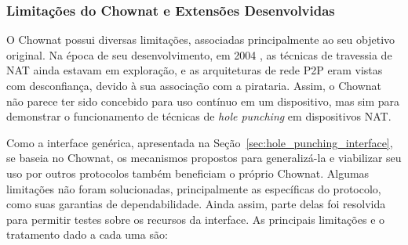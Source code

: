 \subsubsection{Limitações do Chownat e Extensões Desenvolvidas}
\label{sec:chownat_limitations}

O Chownat possui diversas limitações, associadas principalmente ao seu objetivo original. Na época de seu desenvolvimento, em 2004 \citep{kamkar2004chownat}, as técnicas de travessia de NAT ainda estavam em exploração, e as arquiteturas de rede P2P eram vistas com desconfiança, devido à sua associação com a pirataria. Assim, o Chownat não parece ter sido concebido para uso contínuo em um dispositivo, mas sim para demonstrar o funcionamento de técnicas de \textit{hole punching} em dispositivos NAT.

Como a interface genérica, apresentada na Seção~\ref{sec:hole_punching_interface}, se baseia no Chownat, os mecanismos propostos para generalizá-la e viabilizar seu uso por outros protocolos também beneficiam o próprio Chownat. Algumas limitações não foram solucionadas, principalmente as específicas do protocolo, como suas garantias de dependabilidade. Ainda assim, parte delas foi resolvida para permitir testes sobre os recursos da interface. As principais limitações e o tratamento dado a cada uma são:

